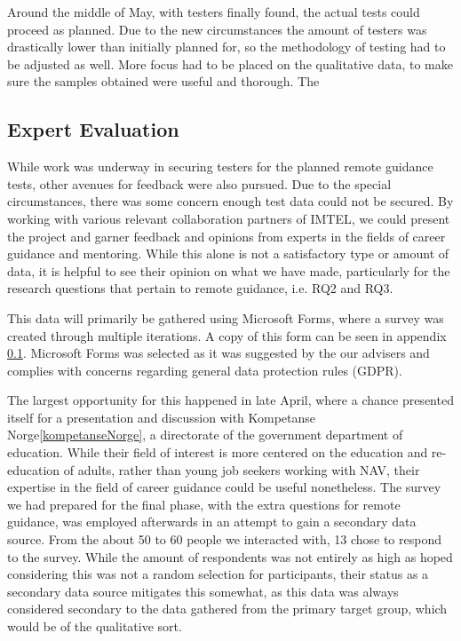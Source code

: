 Around the middle of May, with testers finally found, the actual tests could proceed as planned. Due to the new circumstances the amount of testers was drastically lower than initially planned for, so the methodology of testing had to be adjusted as well. More focus had to be placed on the qualitative data, to make sure the samples obtained were useful and thorough. The 



\subsection{Expert Evaluation}
While work was underway in securing testers for the planned remote guidance tests, other avenues for feedback were also pursued. Due to the special circumstances, there was some concern enough test data could not be secured. By working with various relevant collaboration partners of IMTEL, we could present the project and garner feedback and opinions from experts in the fields of career guidance and mentoring. While this alone is not a satisfactory type or amount of data, it is helpful to see their opinion on what we have made, particularly for the research questions that pertain to remote guidance, i.e. RQ2 and RQ3.

This data will primarily be gathered using Microsoft Forms, where a survey was created through multiple iterations. A copy of this form can be seen in appendix \ref{}. Microsoft Forms was selected as it was suggested by the our advisers and complies with concerns regarding general data protection rules (GDPR).

The largest opportunity for this happened in late April, where a chance presented itself for a presentation and discussion with Kompetanse Norge\ref{kompetanseNorge}, a directorate of the government department of education. While their field of interest is more centered on the education and re-education of adults, rather than young job seekers working with NAV, their expertise in the field of career guidance could be useful nonetheless. The survey we had prepared for the final phase, with the extra questions for remote guidance, was employed afterwards in an attempt to gain a secondary data source. From the about 50 to 60 people we interacted with, 13 chose to respond to the survey. While the amount of respondents was not entirely as high as hoped considering this was not a random selection for participants, their status as a secondary data source mitigates this somewhat, as this data was always considered secondary to the data gathered from the primary target group, which would be of the qualitative sort.

